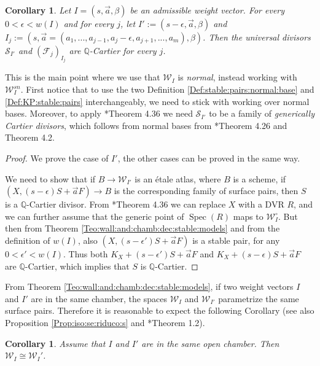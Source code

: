 \documentclass[11pt]{amsart}
\newcommand{\cE}{\mathcal{W}}
\newcommand{\sF}{\mathscr{F}}
\newcommand{\sS}{\mathscr{S}}
\newcommand{\spec}{\operatorname{Spec}}
\newtheorem{Cor}[theorem]{Corollary}
\theoremstyle{definition}
\begin{document}
\begin{Cor}\label{Corollary:Qcartier:threshold:guarantees:Qcartier}
 Let $I=(s,\vec{a},\beta)$ be an admissible weight vector.
 For every $0<\epsilon<w(I)$ and for every $j$, let
 $I':=(s-\epsilon,\vec{a},\beta)$ and $I_j:=(s,\vec{a}=(a_1,...,a_{j-1},a_j-\epsilon,a_{j+1},...,a_m),\beta)$.
 Then the universal divisors $\sS_{I'}$ and $(\sF_j)_{I_j}$ are $\mathbb{Q}$-Cartier for every $j$.
\end{Cor}
This is the main point where we use that $\cE_I$ is \emph{normal}, instead working with $\cE_I^{sn}$. First notice that to use the two Definition \ref{Def:stable:pairs:normal:base} and \ref{Def:KP:stable:pairs} interchangeably, we need to stick with working over normal bases. Moreover, to apply
\cite{kollarbook}*{Theorem 4.36} we need $\sS_{I'}$ to be a family of \emph{generically Cartier divisors}, which follows from normal bases from \cite{kollarbook}*{Theorem 4.26 and Theorem 4.2}.
\begin{proof}
We prove the case of $I'$, the
other cases can be proved in the same way.

We need to show that if $B \to \cE_{I'}$ is an étale atlas, where $B$ is a scheme, if $(X,(s-\epsilon) S+\vec{a}F) \to B$ is the
corresponding family of surface pairs, then $S$ is a $\mathbb{Q}$-Cartier divisor. From
\cite{kollarbook}*{Theorem 4.36} we can replace $X$ with a DVR $R$, and we can further assume that the generic point of $\spec(R)$ maps to
$\cE_I^\circ$. But then from Theorem \ref{Teo:wall:and:chamb:dec:stable:models} and from the definition of $w(I)$,
also $(X,(s-\epsilon') S+\vec{a}F)$ is a stable pair, for any $0 <\epsilon'<w(I)$. Thus both
$K_{X}+(s-\epsilon') S+\vec{a}F$ and $K_X+(s-\epsilon) S+\vec{a}F$ are $\mathbb{Q}$-Cartier, which implies that $S$ is $\mathbb{Q}$-Cartier.
\end{proof}From Theorem \ref{Teo:wall:and:chamb:dec:stable:models}, if two weight vectors $I$ and $I'$ are in the same chamber, the spaces $\cE_I$ and $\cE_{I'}$ parametrize the same surface pairs. Therefore it is reasonable to expect the following Corollary (see also Proposition \ref{Prop:iso:se:riduco:s} and \cite{AB3}*{Theorem 1.2}).
\begin{Cor}Assume that $I$ and $I'$ are in the same open chamber. Then $\cE_I \cong \cE_I'$.
\end{Cor}
\end{document}

